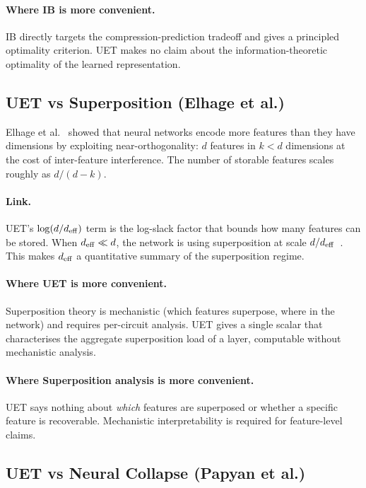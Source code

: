 \paragraph{Where IB is more convenient.}
IB directly targets the compression-prediction tradeoff and gives a principled
optimality criterion.
UET makes no claim about the information-theoretic optimality of the learned
representation.

\subsection{UET vs Superposition (Elhage et al.)}
\label{sec:vs-superposition}

Elhage et al.~\citep{elhage2022superposition} showed that neural networks encode
more features than they have dimensions by exploiting near-orthogonality:
$d$ features in $k < d$ dimensions at the cost of inter-feature interference.
The number of storable features scales roughly as $d / (d - k)$.

\paragraph{Link.}
UET's $\log(d/d_{\mathrm{eff}})$ term is the log-slack factor that bounds how many features
can be stored.
When $d_{\mathrm{eff}} \ll d$, the network is using superposition at scale
$d/d_{\mathrm{eff}}$~\citep{uet2026}.
This makes $d_{\mathrm{eff}}$ a quantitative summary of the superposition regime.

\paragraph{Where UET is more convenient.}
Superposition theory is mechanistic (which features superpose, where in the
network) and requires per-circuit analysis.
UET gives a single scalar that characterises the aggregate superposition
load of a layer, computable without mechanistic analysis.

\paragraph{Where Superposition analysis is more convenient.}
UET says nothing about \emph{which} features are superposed or whether a
specific feature is recoverable.
Mechanistic interpretability is required for feature-level claims.

\subsection{UET vs Neural Collapse (Papyan et al.)}
\label{sec:vs-nc}


